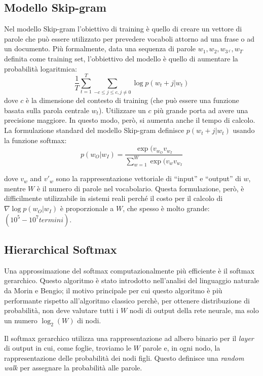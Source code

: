 \documentclass[a4paper,12pt,openright,twoside]{report}
\theoremstyle{definition}
\begin{document}
\subsection{Modello Skip-gram}
Nel modello Skip-gram l'obiettivo di training è quello di creare un vettore di parole che
può essere utilizzato per prevedere vocaboli attorno ad una frase o ad un documento. Più formalmente,
data una sequenza di parole $w_1,w_2,w_3,\dot{},w_T$ definita come training set, 
l'obbiettivo del modello è quello di aumentare la
probabilità logaritmica:
\begin{equation}
	\frac{1}{T} \sum_{t=1}^{T} \sum_{-c\leq j\leq c,j\neq0} \log p(w_t+j|w_t)
	\label{eq:prob log}
\end{equation}
dove $c$ è la dimensione del contesto di training (che può essere una funzione basata sulla parola centrale $w_t$).
Utilizzare un $c$ più grande porta ad avere una precisione maggiore. In questo modo, però, si aumenta anche il 
tempo di calcolo. La formulazione standard del modello Skip-gram definisce $p(w_t+j|w_t)$ usando la funzione
softmax:
\begin{equation}
	p(w_O|w_I) = \frac{\exp(v_{w_O} v_{w_I}}{\sum_{w=1}^{W}\exp(v_w v_{w_I}}
	\label{eq:softmax}
\end{equation}

dove $v_w$ and $v'_w$ sono la rappresentazione vettoriale di ``input'' e ``output'' di $w$, mentre $W$ è il numero
di parole nel vocabolario.
Questa formulazione, però, è difficilmente utilizzabile in sistemi reali
perché il costo per il calcolo di $\nabla\log p(w_O|w_I)$
è proporzionale a $W$, che spesso è molto grande: $(10^5-10^7 termini)$.

\subsection{Hierarchical Softmax}
Una approssimazione del softmax computazionalmente più efficiente è il softmax gerarchico. Questo algoritmo
è stato introdotto nell'analisi del linguaggio naturale da Morin e Bengio; il motivo principale
per cui questo algoritmo è più performante rispetto all'algoritmo classico
perchè, per ottenere distribuzione di probabilità, non deve valutare tutti i $W$
 nodi di output della rete neurale, ma solo un numero  $\log_2(W)$ di nodi.

Il softmax gerarchico utilizza una rappresentazione ad albero binario per il \emph{layer} di output 
in cui, come foglie,
troviamo le $W$ parole e, in ogni nodo, la rappresentazione delle probabilità dei nodi figli.
Questo definisce una \emph{random walk} per assegnare la probabilità alle parole.
\end{document}
